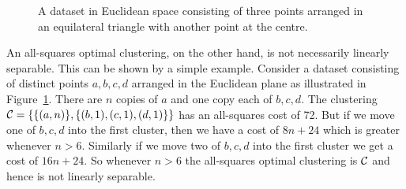 \begin{figure}
  \centering
  \caption{A dataset in Euclidean space consisting of three points arranged in
  an equilateral triangle with another point at the centre.}
  \label{fig:points-in-plane}
\end{figure}

An all-squares optimal clustering, on the other hand, is not necessarily
linearly separable.  This can be shown by a simple example.  Consider a
dataset consisting of distinct points $a,b,c,d$ arranged in the Euclidean
plane as illustrated in Figure~\ref{fig:points-in-plane}.  There are $n$
copies of $a$ and one copy each of $b,c,d$.  The clustering $\mathcal{C} =
\{\{(a,n)\},\{(b,1),(c,1),(d,1)\}\}$ has an all-squares cost of 72.  But if we
move one of $b,c,d$ into the first cluster, then we have a cost of $8n+24$
which is greater whenever $n>6$.  Similarly if we move two of $b,c,d$ into the
first cluster we get a cost of $16n+24$.  So whenever $n>6$ the all-squares
optimal clustering is $\mathcal{C}$ and hence is not linearly separable.



